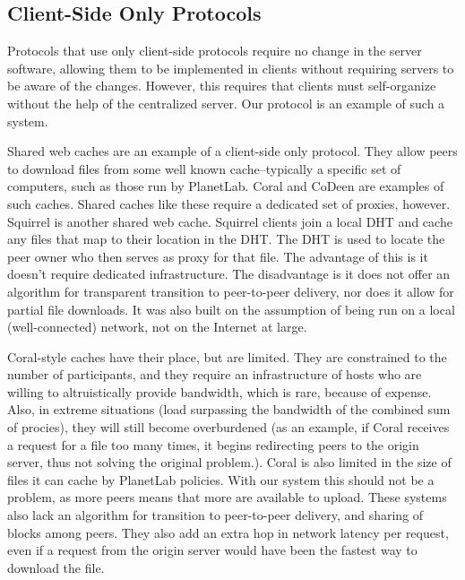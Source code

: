 \subsection{Client-Side Only Protocols}
Protocols that use only client-side protocols require no change in the server software, allowing them to be implemented in clients without requiring servers to be aware of the changes.  However, this requires that clients must self-organize without the help of the centralized server.  Our protocol is an example of such a system.

Shared web caches are an example of a client-side only protocol.  They allow peers to download files from some well known cache--typically a specific set of computers, such as those run by PlanetLab.  Coral \cite{coral} and CoDeen \cite{codeen} are examples of such caches.  Shared caches like these require a dedicated set of proxies, however.  Squirrel \cite{squirrel} is another shared web cache.  Squirrel clients join a local DHT and cache any files that map to their location in the DHT.  The DHT is used to locate the peer owner who then serves as proxy for that file.  The advantage of this is it doesn't require dedicated infrastructure.  The disadvantage is it does not offer an algorithm for transparent transition to peer-to-peer delivery, nor does it allow for partial file downloads.  It was also built on the assumption of being run on a local (well-connected) network, not on the Internet at large.

Coral-style caches have their place, but are limited.  They are constrained to the number of participants, and they require an infrastructure of hosts who are willing to altruistically provide bandwidth, which is rare, because of expense.  Also, in extreme situations (load surpassing the bandwidth of the combined sum of procies), they will still become overburdened (as an example, if Coral receives a request for a file too many times, it begins redirecting peers to the origin server, thus not solving the original problem.).  Coral is also limited in the size of files it can cache by PlanetLab policies.  With our system this should not be a problem, as more peers means that more are available to upload.  These systems also lack an algorithm for transition to peer-to-peer delivery, and sharing of blocks among peers.  They also add an extra hop in network latency per request, even if a request from the origin server would have been the fastest way to download the file.    

